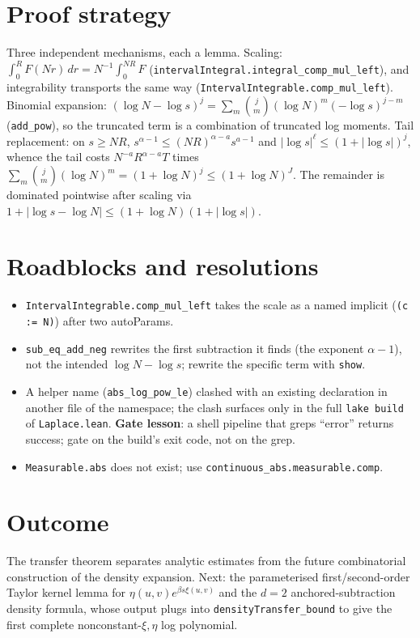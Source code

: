 \documentclass[11pt]{article}
\begin{document}
\section{Proof strategy}
Three independent mechanisms, each a lemma. Scaling: $\int_0^RF(Nr)\,dr=N^{-1}\int_0^{NR}F$
(\texttt{intervalIntegral.integral\_comp\_mul\_left}), and integrability transports the same way
(\texttt{IntervalIntegrable.comp\_mul\_left}). Binomial expansion:
$(\log N-\log s)^j=\sum_m\binom jm(\log N)^m(-\log s)^{j-m}$ (\texttt{add\_pow}), so the truncated
term is a combination of truncated log moments. Tail replacement: on $s\ge NR$,
$s^{\alpha-1}\le(NR)^{\alpha-a}s^{a-1}$ and $|\log s|^\ell\le(1+|\log s|)^j$, whence the tail costs
$N^{-a}R^{\alpha-a}T$ times $\sum_m\binom jm(\log N)^m=(1+\log N)^j\le(1+\log N)^J$. The remainder is
dominated pointwise after scaling via $1+|\log s-\log N|\le(1+\log N)(1+|\log s|)$.

\section{Roadblocks and resolutions}
\begin{itemize}
\item \texttt{IntervalIntegrable.comp\_mul\_left} takes the scale as a named implicit (\texttt{(c := N)})
after two autoParams.
\item \texttt{sub\_eq\_add\_neg} rewrites the first subtraction it finds (the exponent $\alpha-1$),
not the intended $\log N-\log s$; rewrite the specific term with \texttt{show}.
\item A helper name (\texttt{abs\_log\_pow\_le}) clashed with an existing declaration in another file
of the namespace; the clash surfaces only in the full \texttt{lake build} of \texttt{Laplace.lean}.
\textbf{Gate lesson}: a shell pipeline that greps ``error'' returns success; gate on the build's exit
code, not on the grep.
\item \texttt{Measurable.abs} does not exist; use \texttt{continuous\_abs.measurable.comp}.
\end{itemize}

\section{Outcome}
The transfer theorem separates analytic estimates from the future combinatorial construction of the
density expansion. Next: the parameterised first/second-order Taylor kernel lemma for
$\eta(u,v)e^{\beta s\xi(u,v)}$ and the $d=2$ anchored-subtraction density formula, whose output plugs
into \texttt{densityTransfer\_bound} to give the first complete nonconstant-$\xi,\eta$ log polynomial.
\end{document}
